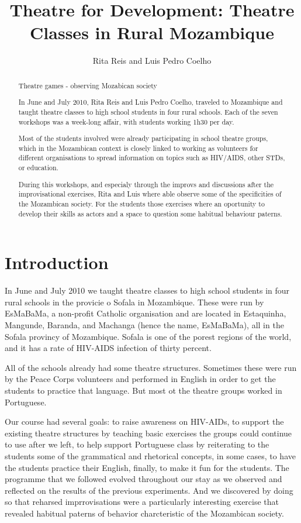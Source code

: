 \documentclass[article,twocolumn,twoside]{memoir}
\title{Theatre for Development: Theatre Classes in Rural Mozambique}
\author{Rita Reis and Luis Pedro Coelho}
\begin{document}
\maketitle

\begin{abstract}

Theatre games - observing Mozabican society

In June and July 2010, Rita Reis and Luis Pedro Coelho, traveled to Mozambique
and taught theatre classes to high school students in four rural schools. Each of the
seven workshops was a week-long affair, with students working 1h30 per day.

Most of the students involved were already participating in school theatre
groups, which in the Mozambican context is closely linked to working as
volunteers for different organisations to spread information on topics such as
HIV/AIDS, other STDs, or education.

During this workshops, and especialy through the improvs and discussions after the
improvisational exercises, Rita and Luis where able observe some of the
specificities of the Mozambican society. For the students those exercises where
an oportunity to develop their skills as actors and a space to question some
habitual behaviour paterns.

\end{abstract}

\chapter{Introduction}
In June and July 2010 we taught theatre classes to high school students in four
rural schools in the provicie o Sofala in Mozambique. These were run by
EsMaBaMa, a non-profit Catholic organisation and are located in Estaquinha,
Mangunde, Baranda, and Machanga (hence the name, EsMaBaMa), all in the Sofala
provincy of Mozambique. Sofala is one of the porest regions of the world, and
it has a rate of HIV-AIDS infection of thirty percent.

All of the schools already had some theatre structures. Sometimes these were
run by the Peace Corps volunteers and performed in English in order to get the
students to practice that language. But most ot the theatre groups worked in
Portuguese.

Our course had several goals: to raise awareness on HIV-AIDs, to support the existing
theatre structures by teaching basic exercises the groups could continue to use
after we left, to help support Portuguese class by reiterating to the students
some of the grammatical and rhetorical concepts, in some cases, to have the
students practice their English, finally, to make it fun for the students. The
programme that we followed evolved throughout our stay as we observed and
reflected on the results of the previous experiments. And we discovered by
doing so that reharsed imprrovisations were a particularly interesting exercise
that revealed habitual paterns of behavior charcteristic of the Mozambican
society.
\end{document}
